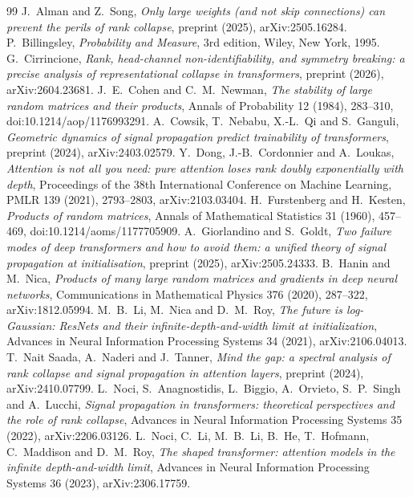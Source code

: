 \documentclass[11pt]{amsart}
\theoremstyle{definition}
\theoremstyle{remark}
\numberwithin{equation}{section}
\begin{document}
\begin{thebibliography}{99}
 J.~Alman and Z.~Song, \emph{Only large weights (and not skip connections) can prevent the perils of rank collapse}, preprint (2025), arXiv:2505.16284.
 P.~Billingsley, \emph{Probability and Measure}, 3rd edition, Wiley, New York, 1995.
G.~Cirrincione, \emph{Rank, head-channel non-identifiability, and symmetry breaking: a precise analysis of representational collapse in transformers}, preprint (2026), arXiv:2604.23681.
 J.~E.~Cohen and C.~M.~Newman, \emph{The stability of large random matrices and their products}, Annals of Probability 12 (1984), 283--310, doi:10.1214/aop/1176993291.
 A.~Cowsik, T.~Nebabu, X.-L.~Qi and S.~Ganguli, \emph{Geometric dynamics of signal propagation predict trainability of transformers}, preprint (2024), arXiv:2403.02579.
 Y.~Dong, J.-B.~Cordonnier and A.~Loukas, \emph{Attention is not all you need: pure attention loses rank doubly exponentially with depth}, Proceedings of the 38th International Conference on Machine Learning, PMLR 139 (2021), 2793--2803, arXiv:2103.03404.
 H.~Furstenberg and H.~Kesten, \emph{Products of random matrices}, Annals of Mathematical Statistics 31 (1960), 457--469, doi:10.1214/aoms/1177705909.
 A.~Giorlandino and S.~Goldt, \emph{Two failure modes of deep transformers and how to avoid them: a unified theory of signal propagation at initialisation}, preprint (2025), arXiv:2505.24333.
 B.~Hanin and M.~Nica, \emph{Products of many large random matrices and gradients in deep neural networks}, Communications in Mathematical Physics 376 (2020), 287--322, arXiv:1812.05994.
 M.~B.~Li, M.~Nica and D.~M.~Roy, \emph{The future is log-Gaussian: ResNets and their infinite-depth-and-width limit at initialization}, Advances in Neural Information Processing Systems 34 (2021), arXiv:2106.04013.
 T.~Nait Saada, A.~Naderi and J.~Tanner, \emph{Mind the gap: a spectral analysis of rank collapse and signal propagation in attention layers}, preprint (2024), arXiv:2410.07799.
 L.~Noci, S.~Anagnostidis, L.~Biggio, A.~Orvieto, S.~P.~Singh and A.~Lucchi, \emph{Signal propagation in transformers: theoretical perspectives and the role of rank collapse}, Advances in Neural Information Processing Systems 35 (2022), arXiv:2206.03126.
 L.~Noci, C.~Li, M.~B.~Li, B.~He, T.~Hofmann, C.~Maddison and D.~M.~Roy, \emph{The shaped transformer: attention models in the infinite depth-and-width limit}, Advances in Neural Information Processing Systems 36 (2023), arXiv:2306.17759.

\end{thebibliography}
\end{document}
